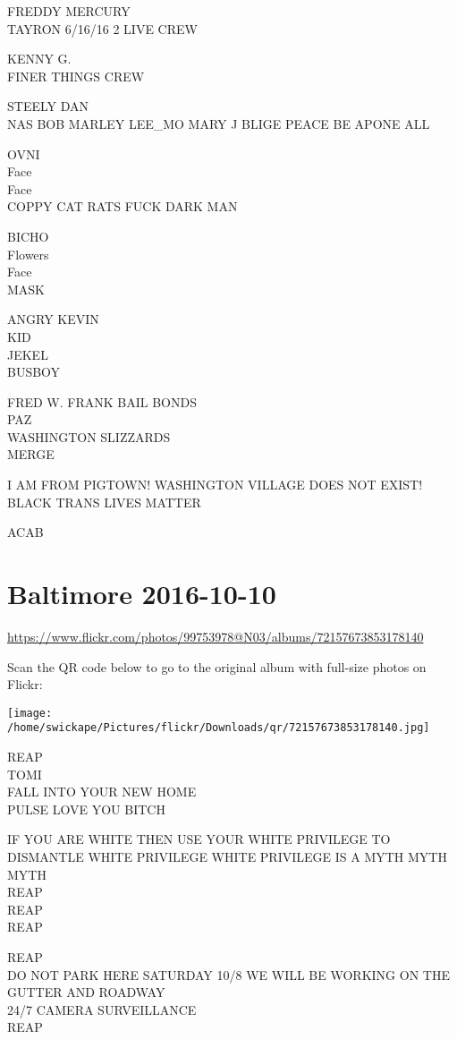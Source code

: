 \documentclass[10pt,letterpaper]{article}
\begin{document}
FREDDY MERCURY\\
TAYRON 6/16/16 2 LIVE CREW

KENNY G.\\
FINER THINGS CREW

STEELY DAN\\
NAS BOB MARLEY LEE\_MO MARY J BLIGE PEACE BE APONE ALL

OVNI\\
Face\\
Face\\
COPPY CAT RATS FUCK DARK MAN

BICHO\\
Flowers\\
Face\\
MASK

ANGRY KEVIN\\
KID\\
JEKEL\\
BUSBOY

FRED W. FRANK BAIL BONDS\\
PAZ\\
WASHINGTON SLIZZARDS\\
MERGE

I AM FROM PIGTOWN!  WASHINGTON VILLAGE DOES NOT EXIST!\\
BLACK TRANS LIVES MATTER

ACAB
\pagebreak

\section*{Baltimore 2016-10-10}

\url{https://www.flickr.com/photos/99753978@N03/albums/72157673853178140}

Scan the QR code below to go to the original album with full-size photos on Flickr:

\texttt{[image: /home/swickape/Pictures/flickr/Downloads/qr/72157673853178140.jpg]}
\pagebreak

REAP\\
TOMI\\
FALL INTO YOUR NEW HOME\\
PULSE LOVE YOU BITCH

IF YOU ARE WHITE THEN USE YOUR WHITE PRIVILEGE TO DISMANTLE WHITE PRIVILEGE WHITE PRIVILEGE IS A MYTH MYTH MYTH\\
REAP\\
REAP\\
REAP

REAP\\
DO NOT PARK HERE SATURDAY 10/8 WE WILL BE WORKING ON THE GUTTER AND ROADWAY\\
24/7 CAMERA SURVEILLANCE\\
REAP
\end{document}
